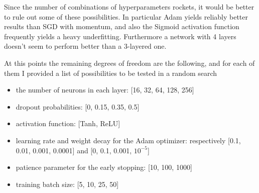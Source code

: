 \documentclass[a4paper, 11pt]{article}
\begin{document}
    Since the number of combinations of hyperparameters rockets, it would be better to rule out some of these possibilities.
    In particular Adam yields reliably better results than SGD with momentum, and also the Sigmoid activation function frequently yields a heavy underfitting. Furthermore a network with 4 layers doesn't seem to perform better than a 3-layered one.

    At this points the remaining degrees of freedom are the following, and for each of them I provided a list of possibilities to be tested in a random search
    \begin{itemize}
      \item the number of neurons in each layer: [16, 32, 64, 128, 256]
      \item dropout probabilities: [0, 0.15, 0.35, 0.5]
      \item activation function: [Tanh, ReLU]
      \item learning rate and weight decay for the Adam optimizer: respectively [0.1, 0.01, 0.001, 0.0001] and [0, 0.1, 0.001, $10^{-5}$]
      \item patience parameter for the early stopping: [10, 100, 1000]
      \item training batch size: [5, 10, 25, 50]
    \end{itemize}
\end{document}
